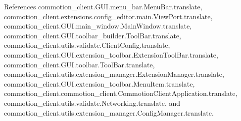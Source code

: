 References commotion\-\_\-client.\-G\-U\-I.\-menu\-\_\-bar.\-Menu\-Bar.\-translate, commotion\-\_\-client.\-extensions.\-config\-\_\-editor.\-main.\-View\-Port.\-translate, commotion\-\_\-client.\-G\-U\-I.\-main\-\_\-window.\-Main\-Window.\-translate, commotion\-\_\-client.\-G\-U\-I.\-toolbar\-\_\-builder.\-Tool\-Bar.\-translate, commotion\-\_\-client.\-utils.\-validate.\-Client\-Config.\-translate, commotion\-\_\-client.\-G\-U\-I.\-extension\-\_\-toolbar.\-Extension\-Tool\-Bar.\-translate, commotion\-\_\-client.\-G\-U\-I.\-toolbar.\-Tool\-Bar.\-translate, commotion\-\_\-client.\-utils.\-extension\-\_\-manager.\-Extension\-Manager.\-translate, commotion\-\_\-client.\-G\-U\-I.\-extension\-\_\-toolbar.\-Menu\-Item.\-translate, commotion\-\_\-client.\-commotion\-\_\-client.\-Commotion\-Client\-Application.\-translate, commotion\-\_\-client.\-utils.\-validate.\-Networking.\-translate, and commotion\-\_\-client.\-utils.\-extension\-\_\-manager.\-Config\-Manager.\-translate.


